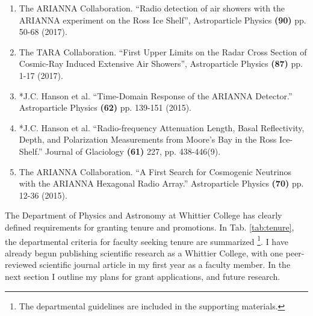 \documentclass[../../main.tex]{subfiles}
\begin{document}
\begin{enumerate}
\begin{itemize}
\end{itemize}
\item The ARIANNA Collaboration. ``Radio detection of air showers with the ARIANNA experiment on the Ross Ice Shelf'', Astroparticle Physics \textbf{(90)} pp. 50-68 (2017).
\item The TARA Collaboration. ``First Upper Limits on the Radar Cross Section of Cosmic-Ray Induced Extensive Air Showers'', Astroparticle Physics \textbf{(87)} pp. 1-17 (2017).
\item *J.C. Hanson et al. ``Time-Domain Response of the ARIANNA Detector.'' Astroparticle Physics \textbf{(62)} pp. 139-151 (2015).
\item *J.C. Hanson et al. ``Radio-frequency Attenuation Length, Basal Reflectivity, Depth, and Polarization Measurements from Moore's Bay in the Ross Ice-Shelf.'' Journal of Glaciology \textbf{(61)} 227, pp. 438-446(9).
\item The ARIANNA Collaboration. ``A First Search for Cosmogenic Neutrinos with the ARIANNA Hexagonal Radio Array.'' Astroparticle Physics \textbf{(70)} pp. 12-36 (2015).
\end{enumerate}

The Department of Physics and Astronomy at Whittier College has clearly defined requirements for granting tenure and promotions.  In Tab. \ref{tab:tenure}, the departmental criteria for faculty seeking tenure are summarized \footnote{The departmental guidelines are included in the supporting materials.}.  I have already begun publishing scientific research as a Whittier College, with one peer-reviewed scientific journal article in my first year as a faculty member.  In the next section I outline my plans for grant applications, and future research.
\end{document}
